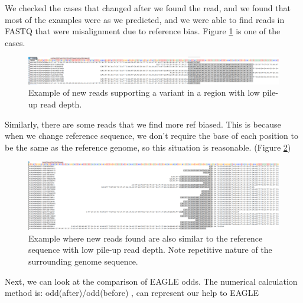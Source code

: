 We checked the cases that changed after we found the read, and we found that most of the examples were as we predicted, and we were able to find reads in FASTQ that were misalignment due to reference bias. Figure \ref{f4-3} is one of the cases.

\vspace{1cm}
\begin{figure}[H]
    \centering
    \includegraphics[width=1\columnwidth]{body/image/4-3.png}
    \captionsetup{labelfont=bf}
    \renewcommand{\baselinestretch}{1.0}
    \vspace{-1cm}
    \caption[New reads in a region with low pile-up read depth]{Example of new reads supporting a variant in a region with low pile-up read depth.}
    \label{f4-3}
\end{figure}

Similarly, there are some reads that we find more ref biased. This is because when we change reference sequence, we don't require the base of each position to be the same as the reference genome, so this situation is reasonable. (Figure \ref{f4-4})

\vspace{1cm}
\begin{figure}[H]
    \centering
    \includegraphics[width=1\columnwidth]{body/image/4-4.png}
    \captionsetup{labelfont=bf}
    \renewcommand{\baselinestretch}{1.0}
    \vspace{-1cm}
    \caption[New reads are similar to the reference with low pile-up read depth]{Example where new reads found are also similar to the reference sequence with low pile-up read depth.  Note repetitive nature of the surrounding genome sequence.}
    \label{f4-4}
\end{figure}

Next, we can look at the comparison of EAGLE odds. 
The numerical calculation method is:
odd(after)/odd(before)
, can represent our help to EAGLE

